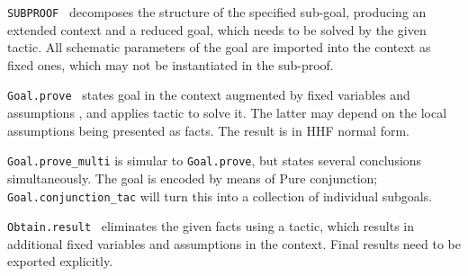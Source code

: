 \begin{isabellebody}
\begin{isamarkuptext}
  \begin{description}

  \item \verb|SUBPROOF|~ decomposes the structure
  of the specified sub-goal, producing an extended context and a
  reduced goal, which needs to be solved by the given tactic.  All
  schematic parameters of the goal are imported into the context as
  fixed ones, which may not be instantiated in the sub-proof.

  \item \verb|Goal.prove|~ states goal  in the context augmented by fixed variables  and
  assumptions , and applies tactic  to solve
  it.  The latter may depend on the local assumptions being presented
  as facts.  The result is in HHF normal form.

  \item \verb|Goal.prove_multi| is simular to \verb|Goal.prove|, but
  states several conclusions simultaneously.  The goal is encoded by
  means of Pure conjunction; \verb|Goal.conjunction_tac| will turn this
  into a collection of individual subgoals.

  \item \verb|Obtain.result|~ eliminates the
  given facts using a tactic, which results in additional fixed
  variables and assumptions in the context.  Final results need to be
  exported explicitly.

  \end{description}%
\end{isamarkuptext}%
\isamarkuptrue%
%
\endisatagmlref
{\isafoldmlref}%
%
\isadelimmlref
%
\endisadelimmlref
%
\isadelimtheory
%
\endisadelimtheory
%
\isatagtheory
{}\isamarkupfalse%
%
\endisatagtheory
{\isafoldtheory}%
%
\isadelimtheory
%
\endisadelimtheory
\isanewline
\end{isabellebody}%
